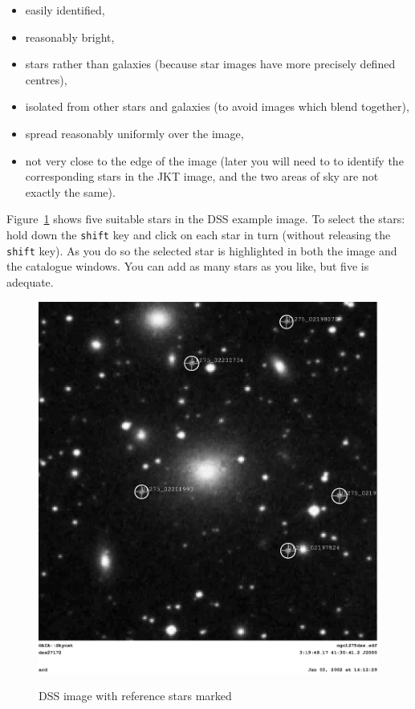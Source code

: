 \documentclass[twoside,11pt]{article}
\begin{document}
\begin{enumerate}
\begin{itemize}
    \item easily identified,

    \item reasonably bright,

    \item stars rather than galaxies (because star images have more
     precisely defined centres),

    \item isolated from other stars and galaxies (to avoid images which
     blend together),

    \item spread reasonably uniformly over the image,

    \item not very close to the edge of the image (later you will need to
     to identify the corresponding stars in the JKT image, and the two
     areas of sky are not exactly the same).

  \end{itemize}

   Figure~\ref{ASTROM_R_PAPER} shows five suitable stars in the DSS
   example image.  To select the stars: hold down the {\tt shift} key and
   click on each star in turn (without releasing the {\tt shift} key).  As
   you do so the selected star is highlighted in both the image and the
   catalogue windows.  You can add as many stars as you like, but five is
   adequate.

  \begin{figure}[htbp]
     \centering
     \includegraphics[totalheight=6in]{sc17_astrom_r_paper.ps}
     \begin{quote}
     \caption{DSS image with reference stars marked
     \label{ASTROM_R_PAPER} }
     \end{quote}
  \end{figure}


\end{enumerate}
\end{document}
